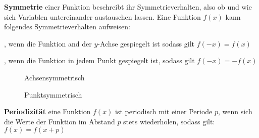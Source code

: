 \pagebreak

\textbf{Symmetrie}  einer Funktion beschreibt ihr Symmetrieverhalten, also ob und wie sich Variablen untereinander austauschen lassen. Eine Funktion $f(x)$ kann folgendes Symmetrieverhalten aufweisen:

\begin{itemize}
	, wenn die Funktion and der $y$-Achse gespiegelt ist sodass gilt $f(-x) = f(x)$

	, wenn die Funktion in jedem Punkt gespiegelt ist, sodass gilt $f(-x) = -f(x)$
\end{itemize}

\begin{figure}[h!]
	\begin{floatrow}
		\ffigbox
		{
		} {\caption*{Achsensymmetrisch}}

		\ffigbox
		{
		} {\caption*{Punktsymmetrisch}}
	\end{floatrow}
\end{figure}

\textbf{Periodizit\"{a}t}  eine Funktion $f(x)$ ist periodisch mit einer Periode $p$, wenn sich die Werte der Funktion im Abstand $p$ stets wiederholen, sodass gilt: $f(x) = f(x + p)$


